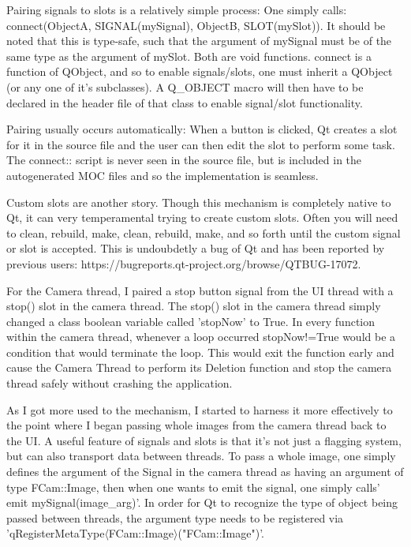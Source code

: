 \documentclass[11pt]{article} %
\begin{document}
Pairing signals to slots is a relatively simple process: One simply calls:   connect(ObjectA, SIGNAL(mySignal), ObjectB, SLOT(mySlot)).
It should be noted that this is type-safe, such that the argument of mySignal must be of the same type as the argument of mySlot. Both are void functions.
connect is a function of QObject, and so to enable signals/slots, one must inherit a QObject (or any one of it's subclasses). A Q\_OBJECT macro will then have to be declared in the header file of that class to enable signal/slot functionality. 

Pairing usually occurs automatically: When a button is clicked, Qt creates a slot for it in the source file and the user can then edit the slot to perform some task. The connect:: script is never seen in the source file, but is included in the autogenerated MOC files and so the implementation is seamless.

Custom slots are another story. Though this mechanism is completely native to Qt, it can very temperamental trying to create custom slots. Often you will need to clean, rebuild, make, clean, rebuild, make, and so forth until the custom signal or slot is accepted. This is undoubdetly a bug of Qt and has been reported by previous users: https://bugreports.qt-project.org/browse/QTBUG-17072.

For the Camera thread, I paired a stop button signal from the UI thread with a stop() slot in the camera thread. The stop() slot in the camera thread simply changed a class boolean variable called 'stopNow' to True.  In every function within the camera thread, whenever a loop occurred  stopNow!=True would be a condition that would terminate the loop. This would exit the function early and cause the Camera Thread to perform its Deletion function and stop the camera thread safely without crashing the application.

As I got more used to the mechanism, I started to harness it more effectively to the point where I began passing whole images from the camera thread back to the UI. A useful feature of signals and slots is that it's not just a flagging system, but can also transport data between threads.  To pass a whole image, one simply defines the argument of the Signal in the camera thread as having an argument of type FCam::Image, then when one wants to emit the signal, one simply calls' emit mySignal(image\_arg)'. In order for Qt to recognize the type of object being passed between threads, the argument type needs to be registered via 'qRegisterMetaType\(\langle\)FCam::Image\(\rangle\)("FCam::Image")'.
\end{document}
